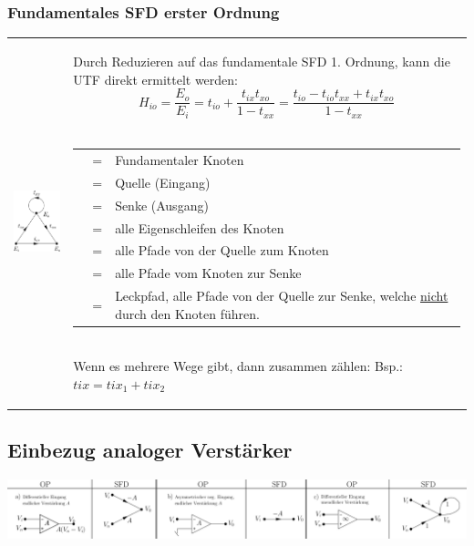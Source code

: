 \subsubsection{Fundamentales SFD erster Ordnung }
\begin{tabular}{ll}
	\parbox{7cm}{
    	\includegraphics[width=3cm]{./images/sfd-fundamental-erster-ordnung.png}
    }
    & \parbox{12cm}{
		Durch Reduzieren auf das fundamentale SFD 1. Ordnung, kann die UTF direkt
		ermittelt werden: \\
		\[ H_{io} = \frac{E_o}{E_i}=
		t_{io}+\frac{t_{ix}t_{xo}}{1-t_{xx}}=
		\frac{t_{io}-t_{io}t_{xx}+t_{ix}t_{xo}}{1-t_{xx}} \] \\
    \begin{tabular}{l l p{8cm}}
      $E_x$ & = & Fundamentaler Knoten\\
      $E_i$ & = & Quelle (Eingang) \\
      $E_o$ & = & Senke (Ausgang) \\
      $t_{xx}$ & = & alle Eigenschleifen des Knoten $E_x$ \\
      $t_{ix}$ & = & alle Pfade von der Quelle zum Knoten $E_x$ \\
      $t_{xo}$ & = &alle Pfade vom Knoten $E_x$ zur Senke \\
      $t_{io}$ & = & Leckpfad, alle Pfade von der Quelle zur Senke, welche \underline{nicht}
      durch den Knoten $E_x$ führen.
    \end{tabular}\\
    Wenn es mehrere Wege gibt, dann zusammen zählen: Bsp.: $tix = tix_1 +
    tix_2$
	}
\end{tabular}


\subsection{Einbezug analoger Verstärker }
\includegraphics[width=18cm]{./images/sfd-op.png}

